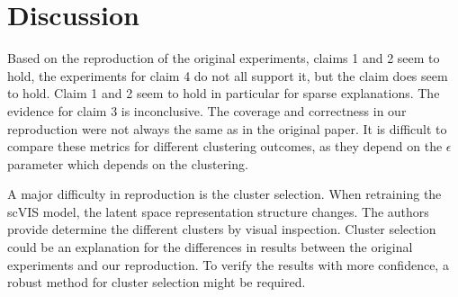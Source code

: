 \section{Discussion}
Based on the reproduction of the original experiments, claims 1 and 2 seem to hold, the experiments for claim 4 do not all support it, but the claim does seem to hold. Claim 1 and 2 seem to hold in particular for sparse explanations. The evidence for claim 3 is inconclusive. The coverage and correctness in our reproduction were not always the same as in the original paper. It is difficult to compare these metrics for different clustering outcomes, as they depend on the $\epsilon$ parameter which depends on the clustering.

A major difficulty in reproduction is the cluster selection. When retraining the scVIS model, the latent space representation structure changes. The authors provide determine the different clusters by visual inspection. Cluster selection could be an explanation for the differences in results between the original experiments and our reproduction. To verify the results with more confidence, a robust method for cluster selection might be required. 




%
%
